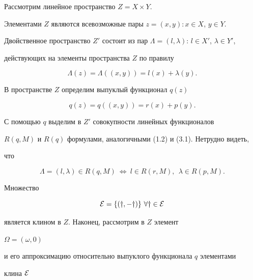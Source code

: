 \begin{pf} 


Рассмотрим линейное пространство $Z=X\times Y$.


Элементами $Z$ являются всевозможные пары $z=(x,y):x\in X$, $y\in Y$. 


Двойственное пространство $Z'$ состоит из пар $\Lambda=(l,\lambda)$: $l\in 


X'$, $\lambda\in Y'$, 


действующих на элементы пространства $Z$ по правилу 


\begin{equation} 


\Lambda(z)=\Lambda((x,y))=l(x)+\lambda(y). 


\end{equation} 


В пространстве $Z$ определим выпуклый функционал $q(z)$ 


\begin{equation} 


q(z)=q((x,y))=r(x)+p(y). 


\end{equation} 


С помощью $q$ выделим в $Z'$ совокупности линейных функционалов 


$R(q,M)$ и $R(q)$ формулами, аналогичными (1.2) и (3.1). Нетрудно видеть, 


что 


\begin{equation} 


\Lambda=(l,\lambda)\in R(q,M)\ \Longleftrightarrow \ 


l\in R(r,M),\ \ \lambda\in R(p,M). 


\end{equation} 


Множество 


\begin{equation} 


\cal E=\{(y,-y)\} \ \forall y\in E


\end{equation} 


является клином в $Z$. Наконец, рассмотрим в $Z$ элемент 


$\Omega=(\omega,0)$ 


и его аппроксимацию относительно выпуклого функционала $q$ элементами 


клина $\cal E$ 


\begin{equation} 



\end{equation}
\end{pf}
